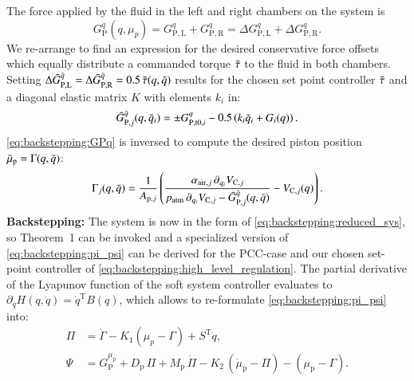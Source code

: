 The force applied by the fluid in the left and right chambers on the system is
\begin{equation}
    G_{\mathrm{P}}^q(q, \mu_p) =  G_{\mathrm{P},\mathrm{L}}^q + G_{\mathrm{P},\mathrm{R}}^q = \Delta G_{\mathrm{P},\mathrm{L}}^q + \Delta G_{\mathrm{P},\mathrm{R}}^q .
\end{equation}
We re-arrange to find an expression for the desired conservative force offsets which equally distribute a commanded torque $\Bar{\tau}$ to the fluid in both chambers. Setting
$\Delta \Bar{G}_{\mathrm{P},\mathrm{L}}^{\Bar{q}} =  \Delta \Bar{G}_{\mathrm{P},\mathrm{R}}^{\Bar{q}} = 0.5 \, \Bar{\tau}(q, \Bar{q})$
results for the chosen set point controller $\Bar{\tau}$ and a diagonal elastic matrix $K$ with elements $k_i$ in:
\begin{equation}\label{eq:backstepping:dist_G_p_q_planar_pcc}
    \Bar{G}_{\mathrm{P},j}^{\Bar{q}}(q, \Bar{q}_i) 
    = \pm G_{\mathrm{P},\mathrm{t}0,i}^{q} - 0.5 \left ( k_i \Bar{q}_i + G_i(q) \right ).
\end{equation}
\eqref{eq:backstepping:GPq} is inversed to compute the desired piston position $\Bar{\mu}_{\mathrm{p}} = \Gamma(q, \Bar{q})$:
\begin{equation}\label{eq:backstepping:gamma}
    \Gamma_j(q, \Bar{q}) = \frac{1}{A_{\mathrm{p},j}} \left ( \frac{\alpha_{\mathrm{air},j} \, \partial_{q_i} V_{\mathrm{C},j}}{p_\mathrm{atm} \, \partial_{q_i} V_{\mathrm{C},j} - \Bar{G}_{\mathrm{P},j}^{\Bar{q}}(q, \Bar{q})} - V_{\mathrm{C},j}(q) \right ).
\end{equation}
\textbf{Backstepping:}
The system is now in the form of \eqref{eq:backstepping:reduced_sys}, so Theorem~1 can be invoked and a specialized version of \eqref{eq:backstepping:pi_psi} can be derived for the \gls{PCC}-case and our chosen set-point controller of \eqref{eq:backstepping:high_level_regulation}. The partial derivative of the Lyapunov function of the soft system controller evaluates to $ \partial_{\dot{q}} H(q, \dot{q}) = \dot{q}^\mathrm{T} B(q)$, which allows to re-formulate \eqref{eq:backstepping:pi_psi} into:
\begin{equation}
\begin{split}
    \Pi &= \dot{\Gamma} - K_1 (\mu_p - \Gamma) + S^\mathrm{T} \dot{q},\\
    \Psi &= G_{\mathrm{P}}^{\mu_\mathrm{p}} + D_\mathrm{p} \, \Pi + M_\mathrm{p} \, \dot{\Pi} - K_2 \, (\dot{\mu}_\mathrm{p} - \Pi) - (\mu_\mathrm{p} - \Gamma).
\end{split}
\end{equation}


